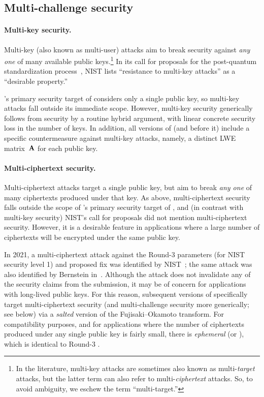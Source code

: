\subsection{Multi-challenge security}%
\label{sec:intro:multi-challenge}

\paragraph{Multi-key security.}

Multi-key (also known as multi-user) attacks aim to break security against \emph{any one} of many available public keys.\footnote{In the literature, multi-key attacks are sometimes also known as multi-\emph{target} attacks, but the latter term can also refer to multi-\emph{ciphertext} attacks.
  So, to avoid ambiguity, we eschew the term ``multi-target.''}
In its call for proposals for the post-quantum standardization process~\cite{NIST17}, NIST lists ``resistance to multi-key attacks'' as a ``desirable property.''

\FrodoKEM's primary security target of \INDCCA considers only a single public key, so multi-key attacks fall outside its immediate scope.
However, multi-key security generically follows from \INDCCA security by a routine hybrid argument, with linear concrete security loss in the number of keys.
In addition, all versions of \FrodoKEM (and \FrodoCCS before it) include a specific countermeasure against multi-key attacks, namely, a distinct LWE matrix~$\mathbf{A}$ for each public key.

\paragraph{Multi-ciphertext security.}

Multi-ciphertext attacks target a single public key, but aim to break \emph{any one} of many ciphertexts produced under that key.
As above, multi-ciphertext security falls outside the scope of \FrodoKEM's primary security target of \INDCCA, and (in contrast with multi-key security) NIST's call for proposals did not mention multi-ciphertext security.
However, it is a desirable feature in applications where a large number of ciphertexts will be encrypted under the same public key.

In 2021, a multi-ciphertext attack against the Round-3 \FrodoKEMLOne parameters (for NIST security level 1) and proposed fix was identified by NIST~\cite{perlner21}; the same attack was also identified by Bernstein in~\cite{EPRINT:Bernstein22d}.
Although the attack does not invalidate any of the security claims from the \FrodoKEM submission, it may be of concern for applications with long-lived public keys.
For this reason, subsequent versions of \FrodoKEM specifically target multi-ciphertext security (and multi-challenge security more generically; see below) via a \emph{salted} version of the Fujisaki--Okamoto transform.
For compatibility purposes, and for applications where the number of ciphertexts produced under any single public key is fairly small, there is \emph{ephemeral} \FrodoKEM (or \eFrodoKEM), which is identical to Round-3 \FrodoKEM.

